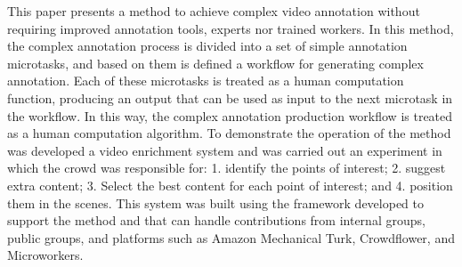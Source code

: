 This paper presents a method to achieve complex video annotation without requiring improved annotation tools, experts nor trained workers. In this method, the complex annotation process is divided into a set of simple annotation microtasks, and based on them is defined a workflow for generating complex annotation. Each of these microtasks is treated as a human computation function, producing an output that can be used as input to the next microtask in the workflow. In this way, the complex annotation production workflow is treated as a human computation algorithm. To demonstrate the operation of the method was developed a video enrichment system and was carried out an experiment in which the crowd was responsible for: 1. identify the points of interest; 2. suggest extra content; 3. Select the best content for each point of interest; and 4. position them in the scenes. This system was built using the framework developed to support the method and that can handle contributions from internal groups, public groups, and platforms such as Amazon Mechanical Turk, Crowdflower, and Microworkers.







